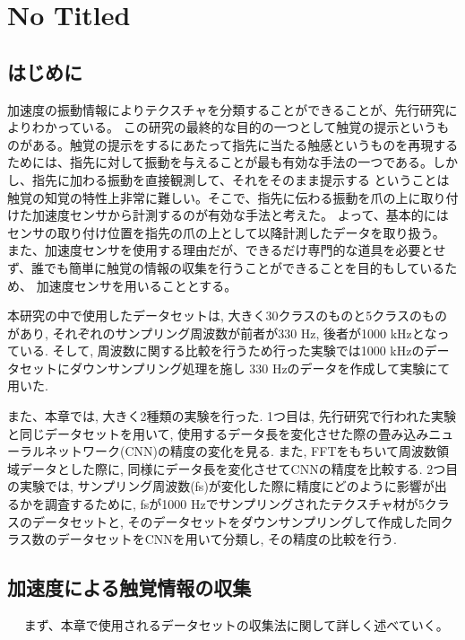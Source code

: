 ﻿\chapter{No Titled} \label{sec:proposal}
\section{はじめに}
	加速度の振動情報によりテクスチャを分類することができることが、先行研究によりわかっている。
	この研究の最終的な目的の一つとして触覚の提示というものがある。触覚の提示をするにあたって指先に当たる触感というものを再現する
	ためには、指先に対して振動を与えることが最も有効な手法の一つである。しかし、指先に加わる振動を直接観測して、それをそのまま提示する
	ということは触覚の知覚の特性上非常に難しい。そこで、指先に伝わる振動を爪の上に取り付けた加速度センサから計測するのが有効な手法と考えた。
	よって、基本的にはセンサの取り付け位置を指先の爪の上として以降計測したデータを取り扱う。
	また、加速度センサを使用する理由だが、できるだけ専門的な道具を必要とせず、誰でも簡単に触覚の情報の収集を行うことができることを目的もしているため、
	加速度センサを用いることとする。

	本研究の中で使用したデータセットは, 大きく30クラスのものと5クラスのものがあり, それぞれのサンプリング周波数が前者が330 Hz, 後者が1000 kHzとなっている. そして, 周波数に関する比較を行うため行った実験では1000 kHzのデータセットにダウンサンプリング処理を施し
	330 Hzのデータを作成して実験にて用いた. 

	また、本章では, 大きく2種類の実験を行った. 1つ目は, 先行研究\cite{c4_}で行われた実験と同じデータセットを用いて, 使用するデータ長を変化させた際の畳み込みニューラルネットワーク(CNN)の精度の変化を見る. また, FFTをもちいて周波数領域データとした際に, 同様にデータ長を変化させてCNNの精度を比較する. 
2つ目の実験では, サンプリング周波数(fs)が変化した際に精度にどのように影響が出るかを調査するために, fsが1000 Hzでサンプリングされたテクスチャ材が5クラスのデータセットと, そのデータセットをダウンサンプリングして作成した同クラス数のデータセットをCNNを用いて分類し, 
その精度の比較を行う. 
\section{加速度による触覚情報の収集}　\label{sec:2.2}
	まず、本章で使用されるデータセットの収集法に関して詳しく述べていく。
